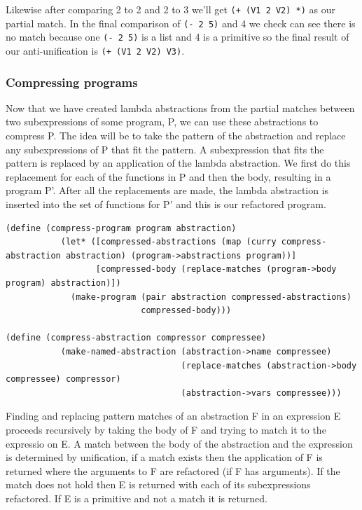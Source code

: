 \documentclass[a4paper,10pt]{article}
\begin{document}
Likewise after comparing 2 to 2 and 2 to 3 we'll get \texttt{(+ (V1 2 V2) *)} as our partial match.
In the final comparison of \texttt{(- 2 5)} and 4 we check can see there is no match because one \texttt{(- 2 5)} is a list and 4 is a primitive so the final result of our anti-unification is \texttt{(+ (V1 2 V2) V3)}.


\subsubsection{Compressing programs}
Now that we have created lambda abstractions from the partial matches between two subexpressions of some program, P, we can use these abstractions to compress P.  The idea will be to take the pattern of the abstraction and replace any subexpressions of P that fit the pattern.  A subexpression that fits the pattern is replaced by an application of the lambda abstraction.  We first do this replacement for each of the functions in P and then the body, resulting in a program P'.  After all the replacements are made, the lambda abstraction is inserted into the set of functions for P' and this is our refactored program.
\begin{lstlisting}[frame=trBL]
(define (compress-program program abstraction)
           (let* ([compressed-abstractions (map (curry compress-abstraction abstraction) (program->abstractions program))]
                  [compressed-body (replace-matches (program->body program) abstraction)])
             (make-program (pair abstraction compressed-abstractions)
                           compressed-body)))

(define (compress-abstraction compressor compressee)
           (make-named-abstraction (abstraction->name compressee)
                                   (replace-matches (abstraction->body compressee) compressor)
                                   (abstraction->vars compressee)))                           
\end{lstlisting}
Finding and replacing pattern matches of an abstraction F in an expression E proceeds recursively by taking the body of F and trying to match it to the expressio on E.  A match between the body of the abstraction and the expression is determined by unification, if a match exists then the application of F is returned where the arguments to F are refactored (if F has arguments).  If the match does not hold then E is returned with each of its subexpressions refactored.  If E is a primitive and not a match it is returned.
\end{document}
